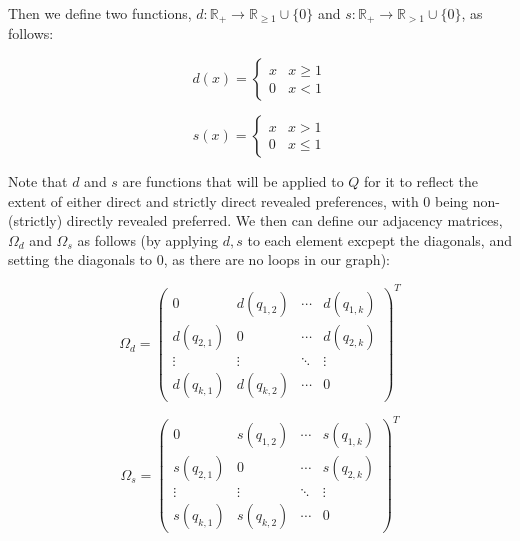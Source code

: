 \documentclass{article} %
\begin{document}
Then we define two functions, $d:\mathbb{R}_{+}\to\mathbb{R}_{\geq1}\cup\{0\}$ and $s:\mathbb{R}_{+}\to\mathbb{R}_{>1}\cup\{0\}$, as follows:

\begin{minipage}{.5\linewidth}
\[ 
d(x)=
 \begin{cases} 
   x & x\geq1 \\
    0 & x<1
 \end{cases}
\]
\end{minipage}
\begin{minipage}{.5\linewidth}
\[
s(x)=
    \begin{cases} 
      x & x>1 \\
      0 & x\leq1
   \end{cases}
\]
\end{minipage}

Note that $d$ and $s$ are functions that will be applied to $Q$ for it to reflect the extent of either direct and strictly direct revealed preferences, with 0 being non-(strictly) directly revealed preferred. We then can define our adjacency matrices, $\Omega_d$ and $\Omega_s$ as follows (by applying $d,s$ to each element excpept the diagonals, and setting the diagonals to 0, as there are no loops in our graph):

\[
\Omega_d =
  \begin{pmatrix}
  0 & d(q_{1,2}) & \cdots & d(q_{1,k}) \\
    d(q_{2,1}) & 0 & \cdots & d(q_{2,k}) \\
    \vdots & \vdots & \ddots & \vdots \\
    d(q_{k,1}) & d(q_{k,2}) & \cdots & 0
  \end{pmatrix}^T
\]

\[
\Omega_s =
  \begin{pmatrix}
  0 & s(q_{1,2}) & \cdots & s(q_{1,k}) \\
    s(q_{2,1}) & 0 & \cdots & s(q_{2,k}) \\
    \vdots & \vdots & \ddots & \vdots \\
    s(q_{k,1}) & s(q_{k,2}) & \cdots & 0
  \end{pmatrix} ^T
\]
\end{document}
